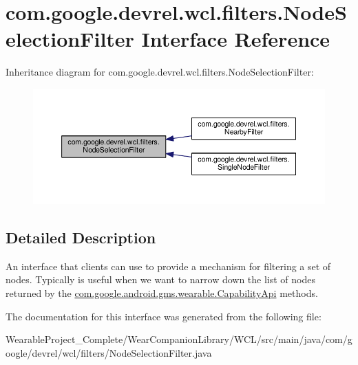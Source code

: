 \hypertarget{interfacecom_1_1google_1_1devrel_1_1wcl_1_1filters_1_1NodeSelectionFilter}{}\section{com.\+google.\+devrel.\+wcl.\+filters.\+Node\+Selection\+Filter Interface Reference}
\label{interfacecom_1_1google_1_1devrel_1_1wcl_1_1filters_1_1NodeSelectionFilter}


Inheritance diagram for com.\+google.\+devrel.\+wcl.\+filters.\+Node\+Selection\+Filter\+:
\nopagebreak
\begin{figure}[H]
\begin{center}
\leavevmode
\includegraphics[width=350pt]{d3/dad/interfacecom_1_1google_1_1devrel_1_1wcl_1_1filters_1_1NodeSelectionFilter__inherit__graph}
\end{center}
\end{figure}


\subsection{Detailed Description}
An interface that clients can use to provide a mechanism for filtering a set of nodes. Typically is useful when we want to narrow down the list of nodes returned by the \hyperlink{}{com.\+google.\+android.\+gms.\+wearable.\+Capability\+Api} methods. 

The documentation for this interface was generated from the following file\+:\begin{DoxyCompactItemize}
\item 
Wearable\+Project\+\_\+\+Complete/\+Wear\+Companion\+Library/\+W\+C\+L/src/main/java/com/google/devrel/wcl/filters/Node\+Selection\+Filter.\+java\end{DoxyCompactItemize}
